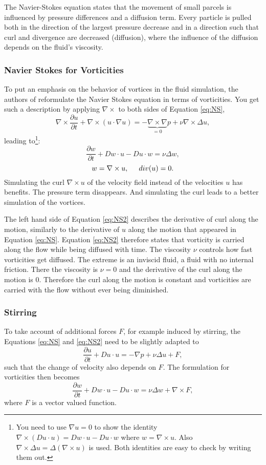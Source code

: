 The Navier-Stokes equation states that the movement of small parcels is influenced by pressure differences and a diffusion term. Every particle is pulled both in the direction of the largest pressure decrease and in a direction such that curl and divergence are decreased (diffusion), where the influence of the diffusion depends on the fluid's viscosity.

\subsubsection{Navier Stokes for Vorticities}
To put an emphasis on the behavior of vortices in the fluid simulation, the authors of \cite{simplicialFluids}  reformulate the Navier Stokes equation in terms of vorticities. You get such a description by applying $\nabla \times$ to both sides of Equation \ref{eq:NS},
\[\nabla \times \frac{\partial u}{ \partial{t}} + \nabla \times (u \cdot \nabla u) = - \underbrace{\nabla\times \nabla}_{=0} p + \nu \nabla \times \Delta u,\]
leading to\footnote{You need to use $\nabla u = 0$ to show the identity $\nabla \times (Du \cdot u) = D w \cdot u - Du \cdot w$ where $w = \nabla \times u$. Also $\nabla \times \Delta u = \Delta (\nabla \times u)$ is used. Both identities are easy to check by writing them out. }:
\begin{equation}\frac{\partial w}{\partial t} + Dw\cdot u - Du \cdot w =  \nu \Delta w,\label{eq:NS2}\end{equation}
\[w = \nabla \times u,\hspace{0.5cm} div(u) = 0.\]
Simulating the curl $\nabla \times u$ of the velocity field instead of the velocities $u$ has benefits. The pressure term disappears. And simulating the curl leads to a better simulation of the vortices. 

The left hand side of Equation \ref{eq:NS2} describes the derivative of curl along the motion, similarly to the derivative of $u$ along the motion that appeared in Equation \ref{eq:NS}. Equation \ref{eq:NS2} therefore states that  vorticity is carried along the flow while being diffused with time. The viscosity $\nu$ controls how fast vorticities get diffused. The extreme is an inviscid fluid, a fluid with no internal friction. There the viscosity is $\nu = 0$ and the derivative of the curl along the motion is 0. Therefore the curl along the motion is constant and vorticities are carried with the flow without ever being diminished.

\subsubsection{Stirring}
To take account of additional forces $F$, for example induced by stirring, the Equations \ref{eq:NS} and \ref{eq:NS2} need to be slightly adapted to
\[\frac{\partial u}{\partial t} + Du \cdot u = -\nabla p + \nu \Delta u + F,\]
such that the change of velocity also depends on $F$. The formulation for vorticities then becomes
\begin{equation}\frac{\partial w}{\partial t} + Dw\cdot u - Du \cdot w =  \nu \Delta w + \nabla \times F \label{eq:NS3},\end{equation}
where $F$ is a vector valued function.

